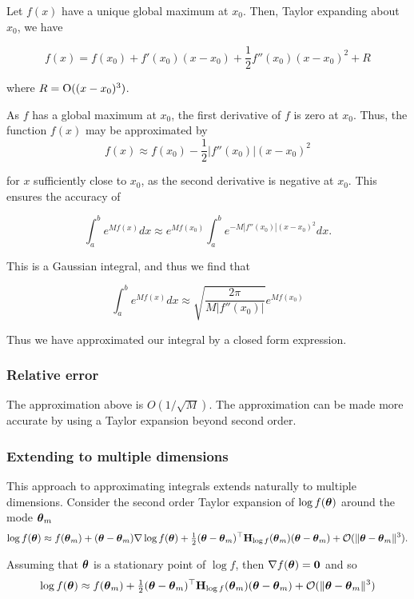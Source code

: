 \documentclass{amsart}[12pt]
\begin{document}
Let $f(x)$ have a unique global maximum at $x_0$. Then, Taylor expanding about $x_0$, we have

\[
	f(x) = f(x_0) + f'(x_0) (x - x_0) + \frac{1}{2} f''(x_0) (x - x_0)^2 + R
\]

where $R = \text{O}((x - x_0)^3)$.

As $f$ has a global maximum at $x_0$, the first derivative of $f$ is zero at $x_0$. Thus, the function $f(x)$
may be approximated by
\[
	f(x) \approx f(x_0) - \frac{1}{2} |f''(x_0)| (x - x_0)^2
\]

for $x$ sufficiently close to $x_0$, as the second derivative is negative at $x_0$. This ensures the
accuracy of

\[
	\int_a^b e^{M f(x)} dx \approx e^{M f(x_0)} \int_a^b e^{-M |f''(x_0)|(x - x_0)^2} dx.
\]

This is a Gaussian integral, and thus we find that

\[
	\int_a^b e^{M f(x)} dx \approx \sqrt{\frac{2 \pi}{M |f''(x_0)|}} e^{M f(x_0)}
\]

Thus we have approximated our integral by a closed form expression.

\subsubsection{Relative error} %
The approximation above is $O(1/\sqrt{M})$. %
The approximation can be made more accurate by using a Taylor
expansion beyond second order.

\subsubsection{Extending to multiple dimensions}
This approach to approximating integrals extends naturally to multiple dimensions.
Consider the second order Taylor expansion of $\log f({\boldsymbol \theta})$ around the mode ${\boldsymbol \theta}_m$
$$
\log f({\boldsymbol \theta}) \approx f({\boldsymbol \theta}_m) + ({\boldsymbol \theta} - {\boldsymbol \theta}_m) \nabla \log f({\boldsymbol \theta}) + \tfrac{1}{2} ({\boldsymbol \theta} - {\boldsymbol \theta}_m)^\top {\bf H}_{\log f}({\boldsymbol \theta}_m) ({\boldsymbol \theta} - {\boldsymbol \theta}_m) + {\mathcal O}(\|{\boldsymbol \theta} - {\boldsymbol \theta}_m\|^3).
$$

Assuming that ${\boldsymbol \theta}$ is a stationary point of $\log f$, then $\nabla f({\boldsymbol \theta}) = {\bf 0}$ and so
$$
\log f({\boldsymbol \theta}) \approx f({\boldsymbol \theta}_m) + \tfrac{1}{2} ({\boldsymbol \theta} - {\boldsymbol \theta}_m)^\top {\bf H}_{\log f}({\boldsymbol \theta}_m) ({\boldsymbol \theta} - {\boldsymbol \theta}_m) + {\mathcal O}(\|{\boldsymbol \theta} - {\boldsymbol \theta}_m\|^3)
$$
\end{document}
